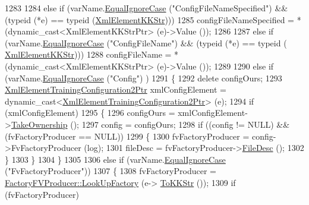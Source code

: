 \begin{DoxyCode}
1283 
1284       \textcolor{keywordflow}{else} \textcolor{keywordflow}{if}  (varName.\hyperlink{class_k_k_b_1_1_k_k_str_a562f9696417c53f66bc4088eac072ab5}{EqualIgnoreCase} (\textcolor{stringliteral}{"ConfigFileNameSpecified"})  &&  (\textcolor{keyword}{typeid} (*e) == \textcolor{keyword}{
      typeid} (\hyperlink{class_k_k_b_1_1_xml_element_k_k_str}{XmlElementKKStr})))
1285         configFileNameSpecified = *(dynamic\_cast<XmlElementKKStrPtr> (e)->Value ());
1286 
1287       \textcolor{keywordflow}{else} \textcolor{keywordflow}{if}  (varName.\hyperlink{class_k_k_b_1_1_k_k_str_a562f9696417c53f66bc4088eac072ab5}{EqualIgnoreCase} (\textcolor{stringliteral}{"ConfigFileName"})  &&  (\textcolor{keyword}{typeid} (*e) == \textcolor{keyword}{typeid} (
      \hyperlink{class_k_k_b_1_1_xml_element_k_k_str}{XmlElementKKStr})))
1288         configFileName = *(dynamic\_cast<XmlElementKKStrPtr> (e)->Value ());
1289 
1290       \textcolor{keywordflow}{else} \textcolor{keywordflow}{if}  (varName.\hyperlink{class_k_k_b_1_1_k_k_str_a562f9696417c53f66bc4088eac072ab5}{EqualIgnoreCase} (\textcolor{stringliteral}{"Config"}) )
1291       \{
1292         \textcolor{keyword}{delete}  configOurs;
1293         \hyperlink{class_k_k_b_1_1_xml_element_template}{XmlElementTrainingConfiguration2Ptr}  xmlConfigElement = \textcolor{keyword}{
      dynamic\_cast<}\hyperlink{class_k_k_b_1_1_xml_element_template}{XmlElementTrainingConfiguration2Ptr}\textcolor{keyword}{>} (e);
1294         \textcolor{keywordflow}{if}  (xmlConfigElement)
1295         \{
1296           configOurs = xmlConfigElement->\hyperlink{class_k_k_b_1_1_xml_element_template_a1fd0ce7b0d0ee0d57fb29ca09d3ad6fc}{TakeOwnership} ();
1297           config = configOurs;
1298           \textcolor{keywordflow}{if}  ((config != NULL)  &&  (fvFactoryProducer == NULL))
1299           \{
1300             fvFactoryProducer = config->FvFactoryProducer (log);
1301             fileDesc = fvFactoryProducer->\hyperlink{class_k_k_m_l_l_1_1_factory_f_v_producer_ab2dea2e51cf9d6a109b52300619e185c}{FileDesc} ();
1302           \}
1303         \}
1304       \}
1305 
1306       \textcolor{keywordflow}{else} \textcolor{keywordflow}{if}  (varName.\hyperlink{class_k_k_b_1_1_k_k_str_a562f9696417c53f66bc4088eac072ab5}{EqualIgnoreCase} (\textcolor{stringliteral}{"FvFactoryProducer"}))
1307       \{
1308         fvFactoryProducer = \hyperlink{class_k_k_m_l_l_1_1_factory_f_v_producer_ab568f702e72172335c791744123bd63d}{FactoryFVProducer::LookUpFactory} (e->
      \hyperlink{class_k_k_b_1_1_xml_element_a3028fc03b79509e6378749f6a8b426b9}{ToKKStr} ());
1309         \textcolor{keywordflow}{if}  (fvFactoryProducer)

\end{DoxyCode}
